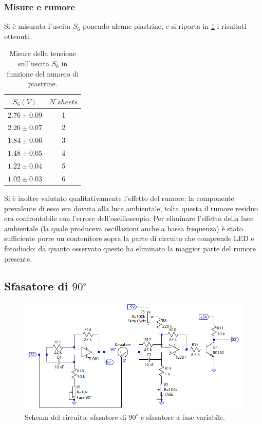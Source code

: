 \documentclass[a4paper,10pt]{article}
\begin{document}
\subsubsection*{Misure e rumore}

Si è misurata l'uscita $ S_6 $ ponendo alcune piastrine, e si riporta in \cref{tab:s6} i risultati ottenuti.

\begin{table}[H]
	\centering
	\begin{tabular}{cc}
		$ S_6 (V)$ & $ N^\circ sheets $\\
		\hline
		$ 2.76 \pm 0.09$	& 1\\
		$ 2.26 \pm 0.07$	& 2\\
		$ 1.84 \pm 0.06$	& 3\\
		$ 1.48 \pm 0.05$	& 4\\
		$ 1.22 \pm 0.04$	& 5\\
		$ 1.02 \pm 0.03$	& 6\\		
	\end{tabular}
\caption{Misure della tensione sull'uscita $ S_6 $ in funzione del numero di piastrine.}
\label{tab:s6}
\end{table}

Si è inoltre valutato qualitativamente l'effetto del rumore: la componente prevalente di esso era dovuta alla luce ambientale, tolta questa il rumore residuo era confrontabile con l'errore dell'oscilloscopio.
Per eliminare l'effetto della luce ambientale (la quale produceva oscillazioni anche a bassa frequenza) è stato sufficiente porre un contenitore sopra la parte di circuito che comprende LED e fotodiodo: da quanto osservato questo ha eliminato la maggior parte del rumore presente.

\subsection{Sfasatore di $90^\circ$}

\begin{figure}[H]
	\centering
	\includegraphics[width=\textwidth]{../grafici/Dephaser.png}
	\caption{Schema del circuito: sfasatore di $90^\circ$ e sfasatore a fase variabile.}
	\label{fig:deph}
\end{figure}
\end{document}
